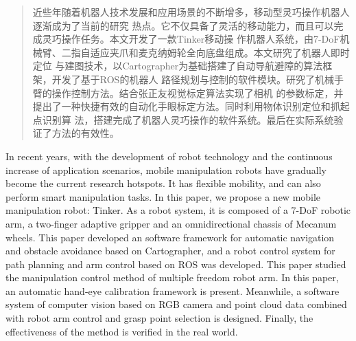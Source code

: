 

\begin{abstract}

  近些年随着机器人技术发展和应用场景的不断增多，移动型灵巧操作机器人逐渐成为了当前的研究
  热点。它不仅具备了灵活的移动能力，而且可以完成灵巧操作任务。本文开发了一款Tinker移动操
  作机器人系统，由7-DoF机械臂、二指自适应夹爪和麦克纳姆轮全向底盘组成。本文研究了机器人即时定位
  与建图技术，以Cartographer为基础搭建了自动导航避障的算法框架，开发了基于ROS的机器人
  路径规划与控制的软件模块。研究了机械手臂的操作控制方法。结合张正友视觉标定算法实现了相机
  的参数标定，并提出了一种快捷有效的自动化手眼标定方法。同时利用物体识别定位和抓起点识别算
  法，搭建完成了机器人灵巧操作的软件系统。最后在实际系统验证了方法的有效性。
  
\end{abstract}

\begin{abstract*}

  In recent years, with the development of robot technology and the continuous
  increase of application scenarios, mobile manipulation robots have gradually
  become the current research hotspots. It has flexible mobility, and can also
  perform smart manipulation tasks. In this paper, we propose a new mobile
  manipulation robot: Tinker. As a robot system, it is composed of a 7-DoF
  robotic arm, a two-finger adaptive gripper and an omnidirectional chassis of
  Mecanum wheels. This paper developed an software framework for automatic navigation
  and obstacle avoidance based on Cartographer, and a robot control
  system for path planning and arm control based on ROS was developed. This paper
  studied the manipulation control method of multiple freedom robot arm. In this
  paper, an automatic hand-eye calibration framework is present. Meanwhile, a
  software system of computer vision based on RGB camera and point cloud data
  combined with robot arm control and grasp point selection
  is designed. Finally, the effectiveness of the method is verified in the real
  world.

\end{abstract*}

